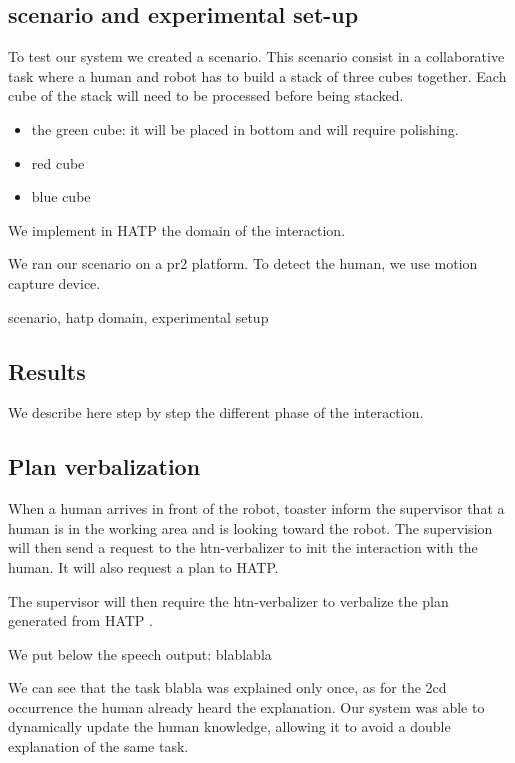 \documentclass{llncs}
\begin{document}
\subsection{scenario and experimental set-up}
To test our system we created a scenario.
This scenario consist in a collaborative task where a human and robot has to build a stack of three cubes together. Each cube of the stack will need to be processed before being stacked.
\begin{itemize}
\item the green cube: it will be placed in bottom and will require polishing.
\item red cube
\item blue cube
\end{itemize}
We implement in HATP the  domain of the interaction.

We ran our scenario on a pr2 platform.
To detect the human, we use motion capture device.





scenario, hatp domain, experimental setup

\subsection{Results}
\label{results}
We describe here step by step the different phase of the interaction.

\subsection{Plan verbalization}
When a human arrives in front of the robot, toaster inform the supervisor that a human is in the working area and is looking toward the robot.
The supervision will then send a request to the htn-verbalizer to init the interaction with the human. It will also request a plan to HATP.

The supervisor will then require the htn-verbalizer to verbalize the plan generated from HATP %
.

We put below the speech output:
blablabla

We can see that the task blabla was explained only once, as for the 2cd occurrence the human already heard the explanation. Our system was able to dynamically update the human knowledge, allowing it to avoid a double explanation of the same task.
\end{document}
